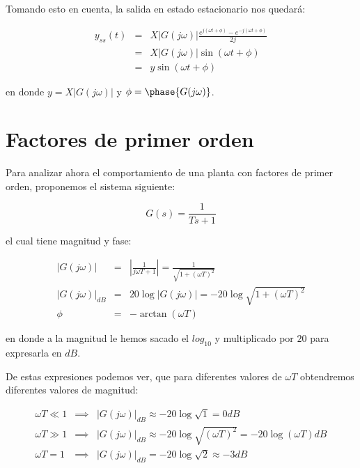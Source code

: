     Tomando esto en cuenta, la salida en estado estacionario nos quedará:

    \begin{eqnarray*}
        y_{ss}(t) & = & X \left| G(j \omega) \right| \frac{e^{j(\omega t + \phi)} - e^{-j(\omega t + \phi)}}{2j} \\
        & = & X \left| G(j \omega) \right| \sin{(\omega t + \phi)} \\
        & = & y \sin{(\omega t + \phi)}
    \end{eqnarray*}

    en donde $y = X \left| G(j \omega) \right|$ y $\phi = \phase{G(j \omega)}$.

    \newpage
    \section{Factores de primer orden}
        Para analizar ahora el comportamiento de una planta con factores de primer orden, proponemos el sistema siguiente:

        \begin{equation*}
            G(s) = \frac{1}{Ts + 1}
        \end{equation*}

        el cual tiene magnitud y fase:

        \begin{eqnarray*}
            \left| G(j \omega) \right| & = & \left| \frac{1}{j \omega T + 1} \right| = \frac{1}{\sqrt{1 + (\omega T)^2}} \\
            \left| G(j \omega) \right|_{dB} & = & 20 \log{\left| G(j \omega) \right|} = -20 \log{\sqrt{1 + (\omega T)^2}} \\
            \phi & = & - \arctan{(\omega T)}
        \end{eqnarray*}

        en donde a la magnitud le hemos sacado el $log_{10}$ y multiplicado por $20$ para expresarla en $dB$.

        De estas expresiones podemos ver, que para diferentes valores de $\omega T$ obtendremos diferentes valores de magnitud:

        \begin{eqnarray*}
            \omega T \ll 1 & \implies & \left| G(j \omega) \right|_{dB} \approx -20 \log{\sqrt{1}} = 0 dB \\
            \omega T \gg 1 & \implies & \left| G(j \omega) \right|_{dB} \approx -20 \log{\sqrt{(\omega T)^2}} = -20 \log{(\omega T)} dB \\
            \omega T = 1 & \implies & \left| G(j \omega) \right|_{dB} = -20 \log{\sqrt{2}} \approx -3 dB
        \end{eqnarray*}

